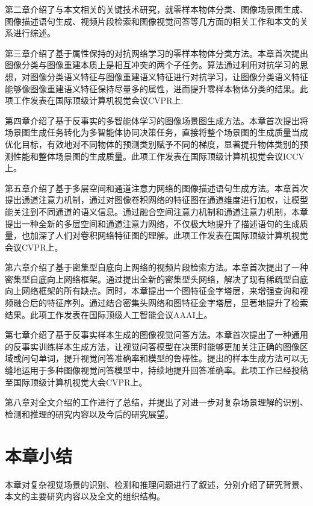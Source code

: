 \begin{asparaitem}

\item 第二章介绍了与本文相关的关键技术研究，就零样本物体分类、图像场景图生成、图像描述语句生成、视频片段检索和图像视觉问答等几方面的相关工作和本文的关系进行综述。

\item 第三章介绍了基于属性保持的对抗网络学习的零样本物体分类方法。本章首次提出图像分类与图像重建本质上是相互冲突的两个子任务。算法通过利用对抗学习的思想，对图像分类语义特征与图像重建语义特征进行对抗学习，让图像分类语义特征能够像图像重建语义特征保持尽量多的属性，进而提升零样本物体分类的结果。此项工作发表在国际顶级计算机视觉会议CVPR上.

\item 第四章介绍了基于反事实的多智能体学习的图像场景图生成方法。本章首次提出将场景图生成任务转化为多智能体协同决策任务，直接将整个场景图的生成质量当成优化目标，有效地对不同物体的预测类别赋予不同的梯度，显著提升物体类别的预测性能和整体场景图的生成质量。此项工作发表在国际顶级计算机视觉会议ICCV上。


\item 第五章介绍了基于多层空间和通道注意力网络的图像描述语句生成方法。本章首次提出通道注意力机制，通过对图像卷积网络的特征图在通道维度进行加权，让模型能关注到不同通道的语义信息。通过融合空间注意力机制和通道注意力机制，本章提出一种全新的多层空间和通道注意力网络，不仅极大地提升了描述语句的生成质量，也加深了人们对卷积网络特征图的理解。此项工作发表在国际顶级计算机视觉会议CVPR上。


\item 第六章介绍了基于密集型自底向上网络的视频片段检索方法。本章首次提出了一种密集型自底向上网络框架。通过提出全新的密集型头网络，解决了现有稀疏型自底向上网络框架的所有缺点。同时，本章提出一个图特征金字塔层，来增强查询和视频融合后的特征序列。通过结合密集头网络和图特征金字塔层，显著地提升了检索结果。此项工作发表在国际顶级人工智能会议AAAI上。


\item 第七章介绍了基于反事实样本生成的图像视觉问答方法。本章首次提出了一种通用的反事实训练样本生成方法，让视觉问答模型在决策时能够更加关注正确的图像区域或问句单词，提升视觉问答准确率和模型的鲁棒性。提出的样本生成方法可以无缝地运用于多种图像视觉问答模型中，持续地提升回答准确率。此项工作已经投稿至国际顶级计算机视觉大会CVPR上。


\item 第八章对全文介绍的工作进行了总结，并提出了对进一步对复杂场景理解的识别、检测和推理的研究内容以及今后的研究展望。

\end{asparaitem}


\section{本章小结}
本章对复杂视觉场景的识别、检测和推理问题进行了叙述，分别介绍了研究背景、本文的主要研究内容以及全文的组织结构。

